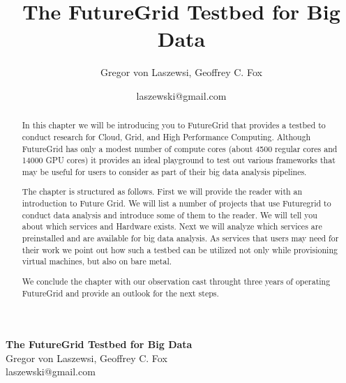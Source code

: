 \documentclass{article}
\makeatletter
\newcommand{\TITLE}{The FutureGrid Testbed for Big Data}
\newcommand{\AUTHOR}{Gregor von Laszewsi, Geoffrey C. Fox}
\newcommand{\EMAIL}{laszewski@gmail.com}
\makeatother
\begin{document}
\title{\TITLE}
\author{\AUTHOR}
\date{\EMAIL}



\begin{center}
{\Large\bf \TITLE}\\
{\AUTHOR}\\
{\EMAIL}
\end{center}

\tableofcontents

\newpage


\listoftodos

\newpage


\maketitle



\begin{abstract}

In this chapter we will be introducing you to FutureGrid that provides a testbed to conduct research for Cloud, Grid, and High Performance Computing. Although FutureGrid has only a modest number of compute cores (about 4500 regular cores and 14000 GPU cores) it provides an ideal playground to test out various frameworks that may be useful for users to consider as part of their big data analysis pipelines. 

The chapter is structured as follows. First we will provide the reader with an introduction to Future Grid. We will list a number of projects that use Futuregrid to conduct data analysis and introduce some of them to the reader. We will tell you about which services and Hardware exists. Next we will analyze which services are preinstalled and are available for big data analysis. As services that users may need for their work we point out how such a testbed can be utilized not only while provisioning virtual machines, but also on bare metal. 

We conclude the chapter with our observation cast throught three years of operating FutureGrid and provide an outlook for the next steps.
\end{abstract}
\end{document}
